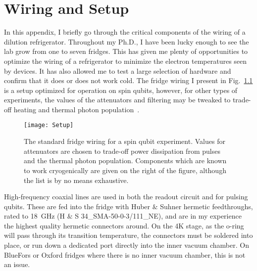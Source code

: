 \chapter{Wiring and Setup}
\label{sec:setup}

In this appendix, I briefly go through the critical components of the wiring of a dilution refrigerator.
Throughout my Ph.D., I have been lucky enough to see the lab grow from one to seven fridges. This has given me
plenty of opportunities to optimize the wiring of a refrigerator to minimize the electron temperatures seen by
devices. It has also allowed me to test a large selection of hardware and confirm that it does or does not work
cold. The fridge wiring I present in Fig.~\ref{fig:wiring} is a setup optimized for operation on spin qubits, however,
for other types of experiments, the values of the attenuators and filtering may be tweaked to trade-off heating and thermal
photon population~\cite{Krinner2019}.

\begin{figure}
    \texttt{[image: Setup]}
    \caption[Standard wiring diagram for a dilution refridgerator]
    {\label{fig:wiring}The standard fridge wiring for a spin qubit experiment. Values for attenuators are chosen to trade-off power dissipation from pulses and the thermal photon population. Components which are known to work cryogenically are given on the right of the figure, although the list is by no means exhaustive.}
\end{figure}

High-frequency coaxial lines are used in both the readout circuit and for pulsing qubits. These are fed into
the fridge with Huber $\&$ Suhner hermetic feedthroughs, rated to \SI{18}{\giga\hertz} (H $\&$ S 34\_SMA-50-0-3/111\_NE),
and are in my experience the highest quality hermetic connectors around. On the 4K stage, as the o-ring will pass
through its transition temperature, the connectors must be soldered into place, or run down a dedicated port
directly into the inner vacuum chamber. On BlueFors or Oxford fridges where there is no inner vacuum chamber,
this is not an issue.

